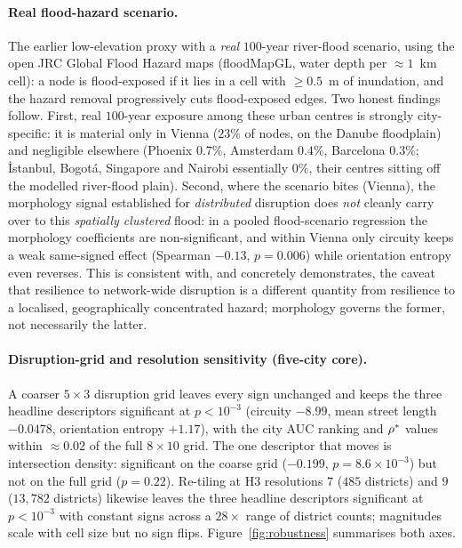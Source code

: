 \paragraph{Real flood-hazard scenario.} The earlier low-elevation
proxy with a \emph{real} $100$-year river-flood scenario, using the open JRC Global
Flood Hazard maps \citep{dottori2016globalflood} (floodMapGL, water depth per
$\approx1$~km cell): a node is flood-exposed if it lies in a cell with $\ge0.5$~m of
inundation, and the hazard removal progressively cuts flood-exposed edges. Two
honest findings follow. First, real $100$-year exposure among these urban centres is
strongly city-specific: it is material only in Vienna ($23\%$ of nodes, on the
Danube floodplain) and negligible elsewhere (Phoenix $0.7\%$, Amsterdam $0.4\%$,
Barcelona $0.3\%$; İstanbul, Bogotá, Singapore and Nairobi essentially $0\%$, their
centres sitting off the modelled river-flood plain). Second, where the scenario
bites (Vienna), the morphology signal established for \emph{distributed} disruption
does \emph{not} cleanly carry over to this \emph{spatially clustered} flood: in a
pooled flood-scenario regression the morphology coefficients are non-significant,
and within Vienna only circuity keeps a weak same-signed effect (Spearman $-0.13$,
$p=0.006$) while orientation entropy even reverses. This is consistent with, and
concretely demonstrates, the caveat that resilience to network-wide disruption is a
different quantity from resilience to a localised, geographically concentrated
hazard; morphology governs the former, not necessarily the latter.

\paragraph{Disruption-grid and resolution sensitivity (five-city core).} A coarser $5\times3$
disruption grid leaves every sign unchanged and keeps the three headline descriptors
significant at $p<10^{-3}$ (circuity $-8.99$, mean street length $-0.0478$,
orientation entropy $+1.17$), with the city AUC ranking and $\rho^{*}$ values within
$\approx0.02$ of the full $8\times10$ grid. The one descriptor that moves is
intersection density: significant on the coarse grid ($-0.199$,
$p=8.6\times10^{-3}$) but not on the full grid ($p=0.22$). Re-tiling at H3
resolutions $7$ ($485$ districts) and $9$ ($13{,}782$ districts) likewise leaves the
three headline descriptors significant at $p<10^{-3}$ with constant signs across a
$28\times$ range of district counts; magnitudes scale with cell size but no sign
flips. Figure~\ref{fig:robustness} summarises both axes.


